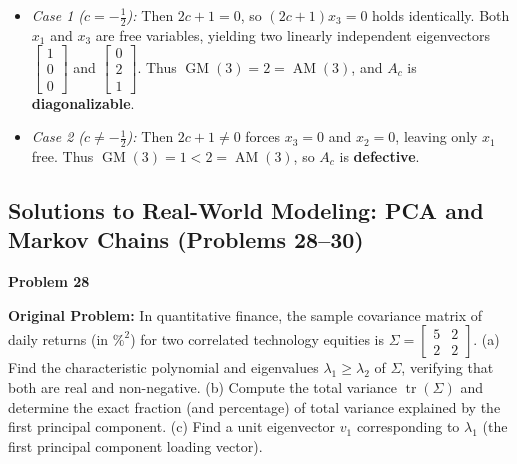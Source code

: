 \documentclass[11pt, letterpaper]{article}
\theoremstyle{definition}
\theoremstyle{remark}
\begin{document}
\begin{enumerate}[label=(\alph*), topsep=3pt, itemsep=4pt]
\begin{itemize}[topsep=2pt, itemsep=2pt]
        \item \textit{Case 1 ($c = -\frac{1}{2}$):} Then $2c + 1 = 0$, so $(2c + 1)x_3 = 0$ holds identically. Both $x_1$ and $x_3$ are free variables, yielding two linearly independent eigenvectors $\begin{bmatrix} 1 \\ 0 \\ 0 \end{bmatrix}$ and $\begin{bmatrix} 0 \\ 2 \\ 1 \end{bmatrix}$. Thus $\operatorname{GM}(3) = 2 = \operatorname{AM}(3)$, and $A_c$ is \textbf{diagonalizable}.
        \item \textit{Case 2 ($c \neq -\frac{1}{2}$):} Then $2c + 1 \neq 0$ forces $x_3 = 0$ and $x_2 = 0$, leaving only $x_1$ free. Thus $\operatorname{GM}(3) = 1 < 2 = \operatorname{AM}(3)$, so $A_c$ is \textbf{defective}.
    \end{itemize}
\end{enumerate}

\subsection{Solutions to Real-World Modeling: PCA and Markov Chains (Problems 28--30)}

\noindent\textbf{Problem 28}

\textbf{Original Problem:} In quantitative finance, the sample covariance matrix of daily returns (in $\%^2$) for two correlated technology equities is $\Sigma = \begin{bmatrix} 5 & 2 \\ 2 & 2 \end{bmatrix}$. (a) Find the characteristic polynomial and eigenvalues $\lambda_1 \ge \lambda_2$ of $\Sigma$, verifying that both are real and non-negative. (b) Compute the total variance $\operatorname{tr}(\Sigma)$ and determine the exact fraction (and percentage) of total variance explained by the first principal component. (c) Find a unit eigenvector $v_1$ corresponding to $\lambda_1$ (the first principal component loading vector).
\end{document}
